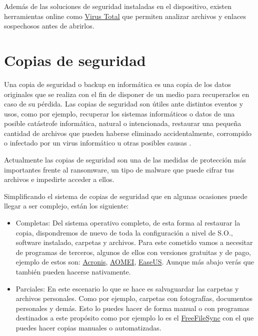 \documentclass[
  spanish,
  a4paper,
  openany]{book}
\begin{document}
Además de las soluciones de seguridad instaladas en el dispositivo, existen herramientas online como \href{https://www.virustotal.com/gui/}{Virus Total} que permiten analizar archivos y enlaces sospechosos antes de abrirlos.

\section{Copias de seguridad}\label{copias-de-seguridad}

Una copia de seguridad o backup en informática es una copia de los datos originales que se realiza con el fin de disponer de un medio para recuperarlos en caso de su pérdida. Las copias de seguridad son útiles ante distintos eventos y usos, como por ejemplo, recuperar los sistemas informáticos o datos de una posible catástrofe informática, natural o intencionada, restaurar una pequeña cantidad de archivos que pueden haberse eliminado accidentalmente, corrompido o infectado por un virus informático u otras posibles causas \citep{WIKI-copias-seguridad}.

Actualmente las copias de seguridad son una de las medidas de protección más importantes frente al ransomware, un tipo de malware que puede cifrar tus archivos e impedirte acceder a ellos.

Simplificando el sistema de copias de seguridad que en algunas ocasiones puede llegar a ser complejo, están los siguiente:

\begin{itemize}
\item
  Completas: Del sistema operativo completo, de esta forma al restaurar la copia, dispondremos de nuevo de toda la configuración a nivel de S.O., software instalado, carpetas y archivos. Para este cometido vamos a necesitar de programas de terceros, algunos de ellos con versiones gratuitas y de pago, ejemplo de estos son: \href{https://www.acronis.com/}{Acronis}, \href{https://www.aomeitech.com/}{AOMEI}, \href{https://www.easeus.com/}{EaseUS}. Aunque más abajo verás que también pueden hacerse nativamente.
\item
  Parciales: En este escenario lo que se hace es salvaguardar las carpetas y archivos personales. Como por ejemplo, carpetas con fotografías, documentos personales y demás. Esto lo puedes hacer de forma manual o con programas destinados a este propósito como por ejemplo lo es el \href{https://freefilesync.org/}{FreeFileSync} con el que puedes hacer copias manuales o automatizadas.
\end{itemize}
\end{document}
